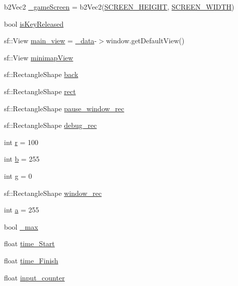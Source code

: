 \begin{DoxyCompactItemize}
\item 
b2\+Vec2 \hyperlink{classSekander_1_1GameState_a3967f08ea45421b5c4ec1a4e6fd1116b}{\+\_\+game\+Screen} = b2\+Vec2(\hyperlink{DEFINITIONS_8hpp_a6974d08a74da681b3957b2fead2608b8}{S\+C\+R\+E\+E\+N\+\_\+\+H\+E\+I\+G\+HT}, \hyperlink{DEFINITIONS_8hpp_a2cd109632a6dcccaa80b43561b1ab700}{S\+C\+R\+E\+E\+N\+\_\+\+W\+I\+D\+TH})
\item 
bool \hyperlink{classSekander_1_1GameState_ad03cd6358b24a3559c71eb904df73d5f}{is\+Key\+Released}
\item 
sf\+::\+View \hyperlink{classSekander_1_1GameState_ae5db885953e773fdbce4faf6ad03d480}{main\+\_\+view} = \hyperlink{classSekander_1_1GameState_a8d4871b8f695026f712a631f4d15a7bc}{\+\_\+data}-\/$>$window.\+get\+Default\+View()
\item 
sf\+::\+View \hyperlink{classSekander_1_1GameState_a4eacd2ce75969c80fc68be5fecd97c70}{minimap\+View}
\item 
sf\+::\+Rectangle\+Shape \hyperlink{classSekander_1_1GameState_add4fe356184898f68a463d3d7b06303f}{back}
\item 
sf\+::\+Rectangle\+Shape \hyperlink{classSekander_1_1GameState_a3b73733184431654c40332cf76735265}{rect}
\item 
sf\+::\+Rectangle\+Shape \hyperlink{classSekander_1_1GameState_a2ee11887ef73fd6176d8d2ce8ef3c110}{pause\+\_\+window\+\_\+rec}
\item 
sf\+::\+Rectangle\+Shape \hyperlink{classSekander_1_1GameState_a5286183d60d019bb4a2883e46a183b86}{debug\+\_\+rec}
\item 
int \hyperlink{classSekander_1_1GameState_a0d3ea2a26abb6cd10c3e493381400ada}{r} = 100
\item 
int \hyperlink{classSekander_1_1GameState_a6985b7cdb15e9be323ccc856379c15bb}{b} = 255
\item 
int \hyperlink{classSekander_1_1GameState_a31e0ac873c64d342e1d010e12edc0e22}{g} = 0
\item 
sf\+::\+Rectangle\+Shape \hyperlink{classSekander_1_1GameState_ad44c780816824050101c1489f0f231be}{window\+\_\+rec}
\item 
int \hyperlink{classSekander_1_1GameState_a5801f9acb771c8886aba02eb17a7b6eb}{a} = 255
\item 
bool \hyperlink{classSekander_1_1GameState_ad905829e53a1e331b6859010ddea5d86}{\+\_\+max}
\item 
float \hyperlink{classSekander_1_1GameState_a272cac0ace6067683e12a7a37c0ab759}{time\+\_\+\+Start}
\item 
float \hyperlink{classSekander_1_1GameState_a676037f8cc02d84ad0ef52f8b73ee1ad}{time\+\_\+\+Finish}
\item 
float \hyperlink{classSekander_1_1GameState_a1f7b418a56b6e8f31d33db63b1c4fd91}{input\+\_\+counter}
\end{DoxyCompactItemize}
